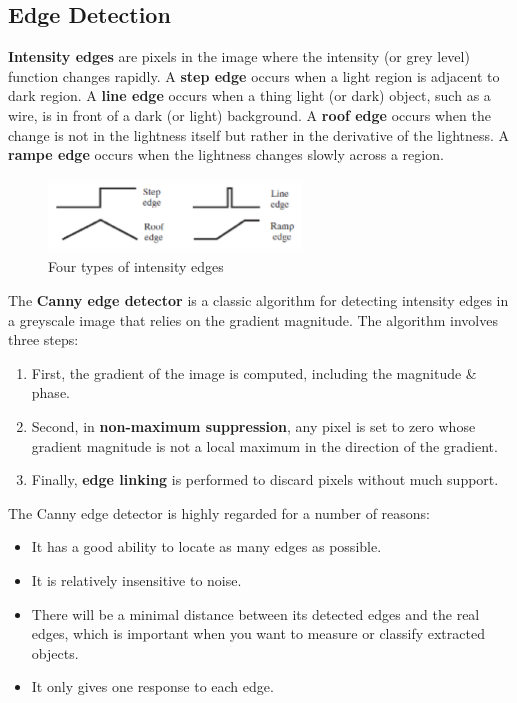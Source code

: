 \documentclass[a4paper,11pt]{article}
\begin{document}
\subsection{Edge Detection}
\textbf{Intensity edges} are pixels in the image where the intensity (or grey level) function changes rapidly.
A \textbf{step edge} occurs when a light region is adjacent to  dark region.
A \textbf{line edge} occurs when a thing light (or dark) object, such as a wire, is in front of a dark (or light) background.
A \textbf{roof edge} occurs when the change is not in the lightness itself but rather in the derivative of the lightness.
A \textbf{rampe edge} occurs when the lightness changes slowly across a region.

\begin{figure}[H]
    \centering
    \includegraphics[width=0.6\textwidth]{images/intesnityedges.png}
    \caption{Four types of intensity edges}
\end{figure}

The \textbf{Canny edge detector} is a classic algorithm for detecting intensity edges in a greyscale image that relies on the gradient magnitude.
The algorithm involves three steps:
\begin{enumerate}
    \item   First, the gradient of the image is computed, including the magnitude \& phase.
    \item   Second, in \textbf{non-maximum suppression}, any pixel is set to zero whose gradient magnitude is not a local maximum in the direction of the gradient.
    \item   Finally, \textbf{edge linking} is performed to discard pixels without much support.
\end{enumerate}

The Canny edge detector is highly regarded for a number of reasons:
\begin{itemize}
    \item   It has a good ability to locate as many edges as possible.
    \item   It is relatively insensitive to noise.
    \item   There will be a minimal distance between its detected edges and the real edges, which is important when you want to measure or classify extracted objects.
    \item   It only gives one response to each edge.
\end{itemize}
\end{document}
